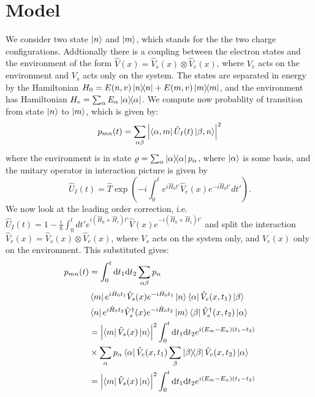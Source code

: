 \documentclass[aps,twocolumn,pra,notitlepage,]{revtex4-2}
\begin{document}
\section{Model}
We consider two state $\ket{n}$ and $\ket{m}$, which stands for the the two charge configurations. Addtionally there is a coupling between the electron states and the environment of the form $\hat V(x) = \hat V_s(x) \otimes \hat V_e(x)$, where $V_e$ acts on the environment and $V_s$ acts only on the system. The states are separated in energy by the Hamiltonian $H_0 = E(n,v) \ketbra{n} + E(m,v)\ketbra{m}$, and the environment has Hamiltonian $H_e = \sum_\alpha E_\alpha \ketbra{\alpha}$. We compute now probablity of transition from state $\ket{n}$ to $\ket{m}$, which is given by:
\begin{equation}
    p_{mn}(t) = \sum_{\alpha \beta} \abs{\bra{\alpha, m} \hat U_I(t) \ket{\beta,n}}^2
\end{equation}
where the environment is in state $\varrho = \sum_\alpha \ketbra{\alpha} p_\alpha$, where $\ket{\alpha}$ is some basis, and the unitary operator in interaction picture is given by
\begin{equation}
\hat U_I(t) = \hat T \exp\left( -i \int_0^t e^{i \hat H_0 t'}\hat V_e(x) e^{-i \hat H_0 t'} dt' \right).
\end{equation}
We now look at the leading order correction, i.e. $\hat U_I(t) = 1 - \frac{i}{\hbar} \int_0^t dt' e^{i (\hat H_0 + \hat H_e) t'}\hat V(x)e^{-i (\hat H_0+\hat H_1) t'}$ and split the interaction $\hat V_e(x) = \hat V_s(x) \otimes \hat V_e(x)$, where $V_s$ acts on the system only, and $V_e(x)$ only on the environment. This substituted gives:
\begin{align}
    p_{mn}(t) &=\int_0^t \text{d}t_1 \text{d}t_2  \sum_{\alpha\beta} p_\alpha \nonumber\\ &\bra{m}e^{i\hat H_0 t_1}\hat V_s(x) e^{-i\hat H_0 t_1}\ket{n}\bra{\alpha}\hat V_e(x,t_1)\ket{\beta}\nonumber \\& 
    \bra{n}e^{i\hat H_0 t_2}\hat V_s^\dagger(x) e^{-i\hat H_0 t_2}\ket{m} \bra{\beta} \hat V_e^\dagger(x,t_2)\ket{\alpha}
    \nonumber \\&=\abs{\bra{m}\hat V_s(x)\ket{n}}^2 
    \int_0^t \text{d}t_1 \text{d}t_2 e^{i(E_m-E_n)(t_1-t_2)}\nonumber \\ &\times \sum_\alpha p_\alpha \bra{\alpha}\hat V_e(x,t_1)\sum_\beta \ketbra{\beta}\hat V_e(x,t_2) \ket \alpha \nonumber \\&=\abs{\bra{m}\hat V_s(x)\ket{n}}^2
    \int_0^t \text{d}t_1 \text{d}t_2 e^{i(E_m-E_n)(t_1-t_2)}
\end{align}
\end{document}
